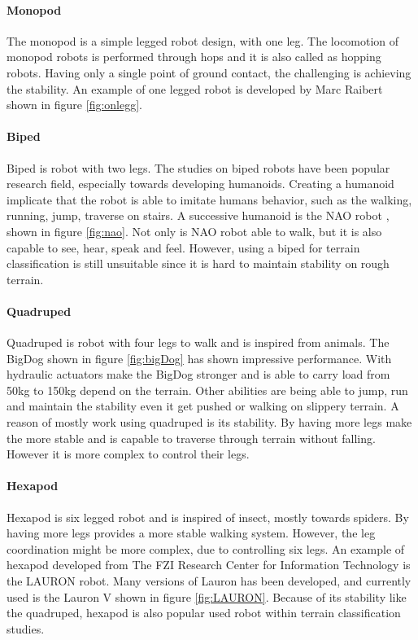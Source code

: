 \documentclass[USenglish]{ifimaster}  %
\begin{document}
	\paragraph{Monopod}
	The monopod is a simple legged robot design, with one leg. The locomotion of monopod robots is performed through hops and it is also called as hopping robots. Having only a single point of ground contact, the challenging is achieving the stability. An example of one legged robot is developed by Marc Raibert shown in figure \ref{fig:onlegg}.
	
	
	\paragraph{Biped}
	Biped is robot with two legs. The studies on biped robots have been popular research field, especially towards developing humanoids. Creating a humanoid implicate that the robot is able to imitate humans behavior, such as the walking, running, jump, traverse on stairs. A successive humanoid is the NAO robot \cite{NAO}, shown in figure \ref{fig:nao}. Not only is NAO robot able to walk, but it is also capable to see, hear, speak and feel. However, using a biped for terrain classification is still unsuitable since it is hard to maintain stability on rough terrain.
	
	\paragraph{Quadruped}
	Quadruped is robot with four legs to walk and is inspired from animals. The BigDog \cite{Raibert200810822} shown in figure \ref{fig:bigDog} has shown impressive performance. With hydraulic actuators make the BigDog stronger and is able to carry load from 50kg to 150kg depend on the terrain. Other abilities are being able to jump, run and maintain the stability even it get pushed or walking on slippery terrain. A reason of mostly work using quadruped is its stability. By having more legs make the more stable and is capable to traverse through terrain without falling. However it is more complex to control their legs.
	
	\paragraph{Hexapod}
	Hexapod is six legged robot and is inspired of insect, mostly towards spiders. By having more legs provides a more stable walking system. However, the leg coordination might be more complex, due to controlling six legs. An example of hexapod developed from The FZI Research Center for Information Technology is the LAURON robot. Many versions of Lauron has been developed, and currently used is the Lauron V shown in figure \ref{fig:LAURON}. Because of its stability like the quadruped, hexapod is also popular used robot within terrain classification studies.
	
\end{document}

